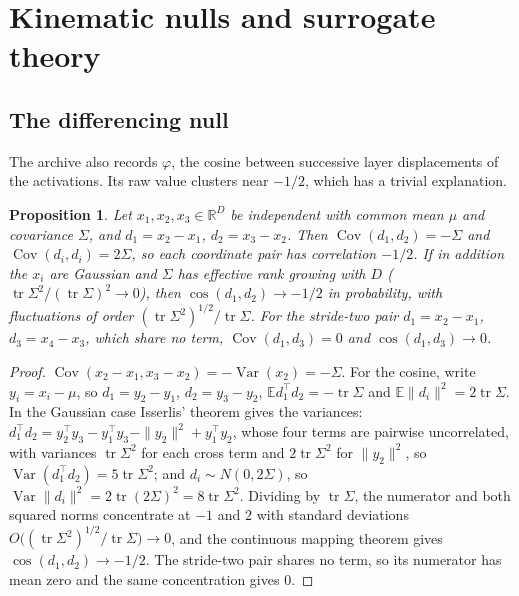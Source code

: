 \documentclass[11pt]{article}
\newtheorem{proposition}[theorem]{Proposition}
\theoremstyle{definition}
\newcommand{\tr}{\operatorname{tr}}
\newcommand{\E}{\mathbb{E}}
\newcommand{\R}{\mathbb{R}}
\begin{document}
\section{Kinematic nulls and surrogate theory}\label{sec:nulls}

\subsection{The differencing null}
The archive also records $\varphi$, the cosine between successive layer displacements of the activations. Its raw value clusters near $-1/2$, which has a trivial explanation.

\begin{proposition}\label{prop:diff}
Let $x_1,x_2,x_3\in\R^D$ be independent with common mean $\mu$ and covariance $\Sigma$, and $d_1=x_2-x_1$, $d_2=x_3-x_2$. Then $\operatorname{Cov}(d_1,d_2)=-\Sigma$ and $\operatorname{Cov}(d_i,d_i)=2\Sigma$, so each coordinate pair has correlation $-1/2$. If in addition the $x_i$ are Gaussian and $\Sigma$ has effective rank growing with $D$ ($\tr\Sigma^2/(\tr\Sigma)^2\to0$), then $\cos(d_1,d_2)\to-1/2$ in probability, with fluctuations of order $(\tr\Sigma^2)^{1/2}/\tr\Sigma$. For the stride-two pair $d_1=x_2-x_1$, $d_3=x_4-x_3$, which share no term, $\operatorname{Cov}(d_1,d_3)=0$ and $\cos(d_1,d_3)\to0$.
\end{proposition}
\begin{proof}
$\operatorname{Cov}(x_2-x_1,x_3-x_2)=-\operatorname{Var}(x_2)=-\Sigma$. For the cosine, write $y_i=x_i-\mu$, so $d_1=y_2-y_1$, $d_2=y_3-y_2$, $\E d_1^\top d_2=-\tr\Sigma$ and $\E\|d_i\|^2=2\tr\Sigma$. In the Gaussian case Isserlis' theorem gives the variances: $d_1^\top d_2=y_2^\top y_3-y_1^\top y_3-\|y_2\|^2+y_1^\top y_2$, whose four terms are pairwise uncorrelated, with variances $\tr\Sigma^2$ for each cross term and $2\tr\Sigma^2$ for $\|y_2\|^2$, so $\operatorname{Var}(d_1^\top d_2)=5\tr\Sigma^2$; and $d_i\sim N(0,2\Sigma)$, so $\operatorname{Var}\|d_i\|^2=2\tr(2\Sigma)^2=8\tr\Sigma^2$. Dividing by $\tr\Sigma$, the numerator and both squared norms concentrate at $-1$ and $2$ with standard deviations $O\big((\tr\Sigma^2)^{1/2}/\tr\Sigma\big)\to0$, and the continuous mapping theorem gives $\cos(d_1,d_2)\to-1/2$. The stride-two pair shares no term, so its numerator has mean zero and the same concentration gives $0$.
\end{proof}
\end{document}
